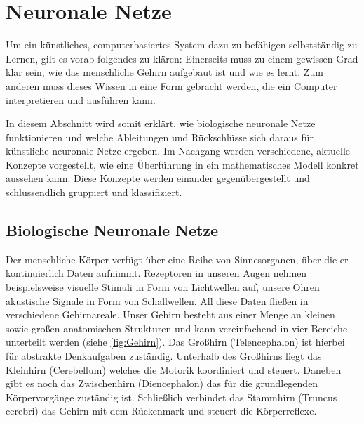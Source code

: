 

\section{Neuronale Netze}
Um ein künstliches, computerbasiertes System dazu zu befähigen selbstständig zu Lernen, gilt es vorab folgendes zu klären: Einerseits muss zu einem gewissen Grad klar sein, wie das menschliche Gehirn aufgebaut ist und wie es lernt. Zum anderen muss dieses Wissen in eine Form gebracht werden, die ein Computer interpretieren und ausführen kann.

In diesem Abschnitt wird somit erklärt, wie biologische neuronale Netze funktionieren und welche Ableitungen und Rückschlüsse sich daraus für künstliche neuronale Netze ergeben. Im Nachgang werden verschiedene, aktuelle Konzepte vorgestellt, wie eine Überführung in ein mathematisches Modell konkret aussehen kann. Diese Konzepte werden einander gegenübergestellt und schlussendlich gruppiert und klassifiziert.


\subsection{Biologische Neuronale Netze}

Der menschliche Körper verfügt über eine Reihe von Sinnesorganen, über die er kontinuierlich Daten aufnimmt. Rezeptoren in unseren Augen nehmen beispielsweise visuelle Stimuli in Form von Lichtwellen auf, unsere Ohren akustische Signale in Form von Schallwellen. All diese Daten fließen in verschiedene Gehirnareale. Unser Gehirn besteht aus einer Menge an kleinen sowie großen anatomischen Strukturen und kann vereinfachend in vier Bereiche unterteilt werden (siehe \autoref{fig:Gehirn}). Das Großhirn (Telencephalon) ist hierbei für abstrakte Denkaufgaben zuständig. Unterhalb des Großhirns liegt das Kleinhirn (Cerebellum) welches die Motorik koordiniert und steuert. Daneben gibt es noch das Zwischenhirn (Diencephalon) das für die grundlegenden Körpervorgänge zuständig ist. Schließlich verbindet das Stammhirn (Truncus cerebri) das Gehirn mit dem Rückenmark und steuert die Körperreflexe.


